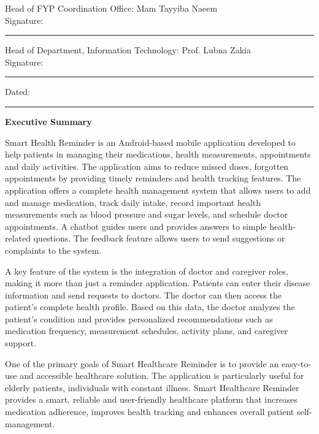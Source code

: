Head of FYP Coordination Office: Mam Tayyiba Naeem\\
\hfill Signature: \rule{4cm}{0.4pt}

\vspace{1cm}

Head of Department, Information Technology: Prof. Lubna Zakia\\
Signature: \rule{4cm}{0.4pt} \hfill Dated: \rule{3cm}{0.4pt}

\vfill

\newpage
\thispagestyle{empty}
\begin{center}
{\Large\bfseries Executive Summary}
\end{center}
\vspace{0.5cm}

Smart Health Reminder is an Android-based mobile application developed to help patients in managing their medications, health measurements, appointments and daily activities. The application aims to reduce missed doses, forgotten appointments by providing timely reminders and health tracking features. The application offers a complete health management system that allows users to add and manage medication, track daily intake, record important health measurements such as blood pressure and sugar levels, and schedule doctor appointments. A chatbot guides users and provides answers to simple health-related questions. The feedback feature allows users to send suggestions or complaints to the system.

A key feature of the system is the integration of doctor and caregiver roles, making it more than just a reminder application. Patients can enter their disease information and send requests to doctors. The doctor can then access the patient's complete health profile. Based on this data, the doctor analyzes the patient's condition and provides personalized recommendations such as medication frequency, measurement schedules, activity plans, and caregiver support.

One of the primary goals of Smart Healthcare Reminder is to provide an easy-to-use and accessible healthcare solution. The application is particularly useful for elderly patients, individuals with constant illness. Smart Healthcare Reminder provides a smart, reliable and user-friendly healthcare platform that increases medication adherence, improves health tracking and enhances overall patient self-management.


